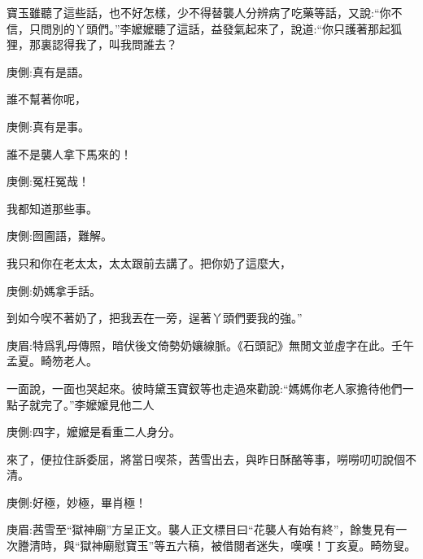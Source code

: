 \begin{parag}
    寶玉雖聽了這些話，也不好怎樣，少不得替襲人分辨病了吃藥等話，又說:“你不信，只問別的丫頭們。”李嬤嬤聽了這話，益發氣起來了，說道:“你只護著那起狐狸，那裏認得我了，叫我問誰去？\begin{note}庚側:真有是語。\end{note}誰不幫著你呢，\begin{note}庚側:真有是事。\end{note}誰不是襲人拿下馬來的！\begin{note}庚側:冤枉冤哉！\end{note}我都知道那些事。\begin{note}庚側:囫圇語，難解。\end{note}我只和你在老太太，太太跟前去講了。把你奶了這麼大，\begin{note}庚側:奶媽拿手話。\end{note}到如今喫不著奶了，把我丟在一旁，逞著丫頭們要我的強。”\begin{note}庚眉:特爲乳母傳照，暗伏後文倚勢奶孃線脈。《石頭記》無閒文並虛字在此。壬午孟夏。畸笏老人。\end{note}一面說，一面也哭起來。彼時黛玉寶釵等也走過來勸說:“媽媽你老人家擔待他們一點子就完了。”李嬤嬤見他二人\begin{note}庚側:四字，嬤嬤是看重二人身分。\end{note}來了，便拉住訴委屈，將當日喫茶，茜雪出去，與昨日酥酪等事，嘮嘮叨叨說個不清。\begin{note}庚側:好極，妙極，畢肖極！\end{note}\begin{note}庚眉:茜雪至“獄神廟”方呈正文。襲人正文標目曰“花襲人有始有終”，餘隻見有一次謄清時，與“獄神廟慰寶玉”等五六稿，被借閱者迷失，嘆嘆！丁亥夏。畸笏叟。\end{note}
\end{parag}


